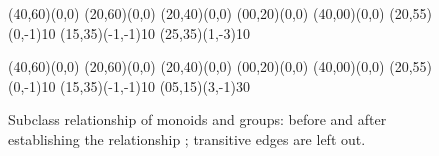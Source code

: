 \begin{isabellebody}
\begin{isamarkuptext}
  \begin{figure}[htbp]
   \begin{center}
     \small
     \unitlength 0.6mm
     \begin{picture}(40,60)(0,0)
       \put(20,60){\makebox(0,0){}}
       \put(20,40){\makebox(0,0){}}
       \put(00,20){\makebox(0,0){}}
       \put(40,00){\makebox(0,0){}}
       \put(20,55){\vector(0,-1){10}}
       \put(15,35){\vector(-1,-1){10}}
       \put(25,35){\vector(1,-3){10}}
     \end{picture}
     \hspace{8em}
     \begin{picture}(40,60)(0,0)
       \put(20,60){\makebox(0,0){}}
       \put(20,40){\makebox(0,0){}}
       \put(00,20){\makebox(0,0){}}
       \put(40,00){\makebox(0,0){}}
       \put(20,55){\vector(0,-1){10}}
       \put(15,35){\vector(-1,-1){10}}
       \put(05,15){\vector(3,-1){30}}
     \end{picture}
     \caption{Subclass relationship of monoids and groups:
        before and after establishing the relationship
        ;  transitive edges are left out.}
     \label{fig:subclass}
   \end{center}
  \end{figure}


\end{isamarkuptext}
\end{isabellebody}
